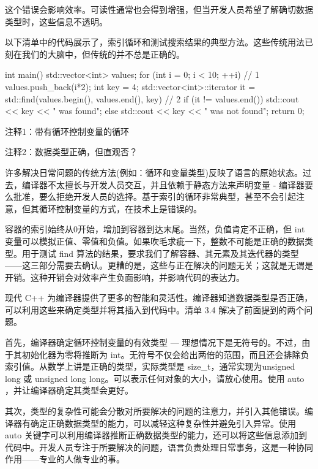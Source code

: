这个错误会影响效率。可读性通常也会得到增强，但当开发人员希望了解确切数据类型时，这些信息不透明。


以下清单中的代码展示了，索引循环和测试搜索结果的典型方法。这些传统用法已刻在我们的大脑中，但传统的并不总是正确的。


\begin{cpp}
int main() {
  std::vector<int> values;
  for (int i = 0; i < 10; ++i) // 1
    values.push_back(i*2);
  int key = 4;
  std::vector<int>::iterator it =
  std::find(values.begin(), values.end(), key) // 2
  if (it != values.end())
    std::cout << key << " was found\n";
  else
    std::cout << key << " was not found\n";
  return 0;
}
\end{cpp}

{\footnotesize
注释1：带有循环控制变量的循环

注释2：数据类型正确，但直观否？
}


许多解决日常问题的传统方法(例如：循环和变量类型)反映了语言的原始状态。过去，编译器不太擅长与开发人员交互，并且依赖于静态方法来声明变量 - 编译器要么批准，要么拒绝开发人员的选择。基于索引的循环非常典型，甚至不会引起注意，但其循环控制变量的方式，在技术上是错误的。

容器的索引始终从0开始，增加到容器到达末尾。当然，负值肯定不正确，但 int 变量可以模拟正值、零值和负值。如果吹毛求疵一下，整数不可能是正确的数据类型。用于测试 find 算法的结果，要求我们了解容器、其元素及其迭代器的类型——这三部分需要去确认。更糟的是，这些与正在解决的问题无关；这就是无谓是开销。这种开销会对效率产生负面影响，并影响代码的表达力。


现代 C++ 为编译器提供了更多的智能和灵活性。编译器知道数据类型是否正确，可以利用这些来确定类型并将其插入到代码中。清单 3.4 解决了前面提到的两个问题。

首先，编译器确定循环控制变量的有效类型 — 理想情况下是无符号的。不过，由于其初始化器为零将推断为 int。无符号不仅会给出两倍的范围，而且还会排除负索引值。从数学上讲是正确的类型，实际类型是 size\_t，通常实现为unsigned long 或 unsigned long long。可以表示任何对象的大小，请放心使用。使用 auto ，并让编译器确定其类型会更好。

其次，类型的复杂性可能会分散对所要解决的问题的注意力，并引入其他错误。编译器有确定正确数据类型的能力，可以减轻这种复杂性并避免引入异常。使用 auto 关键字可以利用编译器推断正确数据类型的能力，还可以将这些信息添加到代码中。开发人员专注于所要解决的问题，语言负责处理日常事务，这是一种协同作用——专业的人做专业的事。

